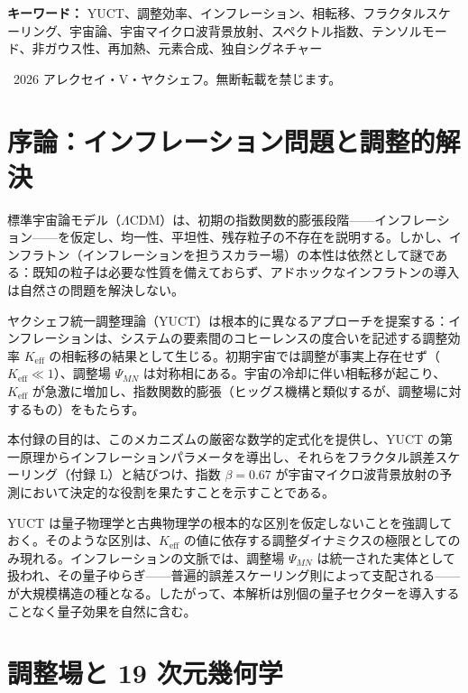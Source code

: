 \documentclass[11pt,a4paper]{article}
\theoremstyle{remark}
\newcommand{\Keff}{K_{\mathrm{eff}}}
\begin{document}
\begin{titlepage}
		\vspace{0.5cm}
		
		\noindent
		{\small\textbf{キーワード：}} YUCT、調整効率、インフレーション、相転移、フラクタルスケーリング、宇宙論、宇宙マイクロ波背景放射、スペクトル指数、テンソルモード、非ガウス性、再加熱、元素合成、独自シグネチャー
		
		\vspace{0.5cm}
		
		\noindent
		\textcopyright\ 2026 アレクセイ・V・ヤクシェフ。無断転載を禁じます。
	\end{titlepage}
	
	\tableofcontents
	\newpage
	
	\section{序論：インフレーション問題と調整的解決}
	\label{sec:intro}
	
	標準宇宙論モデル（$\Lambda$CDM）は、初期の指数関数的膨張段階——インフレーション——を仮定し、均一性、平坦性、残存粒子の不存在を説明する。しかし、インフラトン（インフレーションを担うスカラー場）の本性は依然として謎である：既知の粒子は必要な性質を備えておらず、アドホックなインフラトンの導入は自然さの問題を解決しない。
	
	ヤクシェフ統一調整理論（YUCT）は根本的に異なるアプローチを提案する：インフレーションは、システムの要素間のコヒーレンスの度合いを記述する調整効率 $\Keff$ の相転移の結果として生じる。初期宇宙では調整が事実上存在せず（$\Keff \ll 1$）、調整場 $\Psi_{MN}$ は対称相にある。宇宙の冷却に伴い相転移が起こり、$\Keff$ が急激に増加し、指数関数的膨張（ヒッグス機構と類似するが、調整場に対するもの）をもたらす。
	
	本付録の目的は、このメカニズムの厳密な数学的定式化を提供し、YUCT の第一原理からインフレーションパラメータを導出し、それらをフラクタル誤差スケーリング（付録 L）と結びつけ、指数 $\beta = 0.67$ が宇宙マイクロ波背景放射の予測において決定的な役割を果たすことを示すことである。
	
	YUCT は量子物理学と古典物理学の根本的な区別を仮定しないことを強調しておく。そのような区別は、$K_{\mathrm{eff}}$ の値に依存する調整ダイナミクスの極限としてのみ現れる。インフレーションの文脈では、調整場 $\Psi_{MN}$ は統一された実体として扱われ、その量子ゆらぎ——普遍的誤差スケーリング則によって支配される——が大規模構造の種となる。したがって、本解析は別個の量子セクターを導入することなく量子効果を自然に含む。
	
	\section{調整場と 19 次元幾何学}
	\label{sec:field}
	
\end{document}
